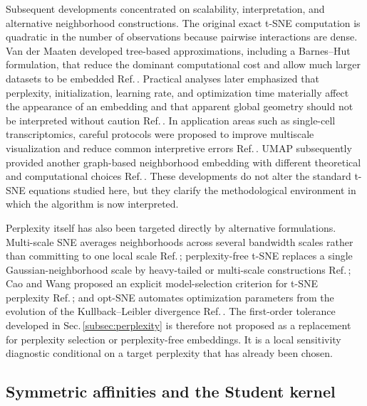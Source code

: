 \documentclass[11pt,a4paper]{article}
\theoremstyle{definition}
\theoremstyle{plain}
\begin{document}
Subsequent developments concentrated on scalability, interpretation, and alternative neighborhood constructions. The original exact t-SNE computation is quadratic in the number of observations because pairwise interactions are dense. Van der Maaten developed tree-based approximations, including a Barnes--Hut formulation, that reduce the dominant computational cost and allow much larger datasets to be embedded Ref.\,\cite{vandermaaten2014}. Practical analyses later emphasized that perplexity, initialization, learning rate, and optimization time materially affect the appearance of an embedding and that apparent global geometry should not be interpreted without caution Ref.\,\cite{wattenberg2016}. In application areas such as single-cell transcriptomics, careful protocols were proposed to improve multiscale visualization and reduce common interpretive errors Ref.\,\cite{kobak2019}. UMAP subsequently provided another graph-based neighborhood embedding with different theoretical and computational choices Ref.\,\cite{mcinnes2018umap}. These developments do not alter the standard t-SNE equations studied here, but they clarify the methodological environment in which the algorithm is now interpreted.

Perplexity itself has also been targeted directly by alternative formulations. Multi-scale SNE averages neighborhoods across several bandwidth scales rather than committing to one local scale Ref.\,\cite{lee2015multiscale}; perplexity-free t-SNE replaces a single Gaussian-neighborhood scale by heavy-tailed or multi-scale constructions Ref.\,\cite{debodt2018perplexityfree}; Cao and Wang proposed an explicit model-selection criterion for t-SNE perplexity Ref.\,\cite{cao2017perplexity}; and opt-SNE automates optimization parameters from the evolution of the Kullback--Leibler divergence Ref.\,\cite{belkina2019optsne}. The first-order tolerance developed in Sec.\,\ref{subsec:perplexity} is therefore not proposed as a replacement for perplexity selection or perplexity-free embeddings. It is a local sensitivity diagnostic conditional on a target perplexity that has already been chosen.


\subsection{Symmetric affinities and the Student kernel}
\label{subsec:tsne_probabilities}
\end{document}
